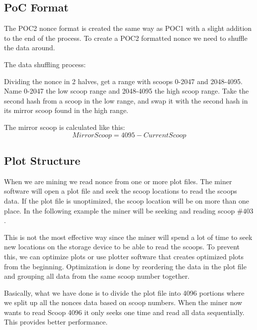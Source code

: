 \subsection{PoC Format}
\begin{flushleft}
    The POC2 nonce format is created the same way as POC1 with a slight addition to the end of the process. To create a POC2 formatted nonce we need to shuffle the data around.
\end{flushleft}
\begin{flushleft}
    The data shuffling process:
\end{flushleft}
\begin{flushleft}
    Dividing the nonce in 2 halves, get a range with scoops 0-2047 and 2048-4095. Name 0-2047 the low scoop range and 2048-4095 the high scoop range. Take the second hash from a scoop in the low range, and swap it with the second hash in its mirror scoop found in the high range.
\end{flushleft}
\begin{flushleft}
    The mirror scoop is calculated like this:
    \begin{equation}
        MirrorScoop = 4095 - CurrentScoop
    \end{equation}
\end{flushleft}

\subsection{Plot Structure}
\begin{flushleft}
    When we are mining we read nonce from one or more plot files. The miner software will open a plot file and seek the scoop locations to read the scoops data. If the plot file is unoptimized, the scoop location will be on more than one place. In the following example the miner will be seeking and reading scoop $\#403$.
\end{flushleft}

\begin{flushleft}
    This is not the most effective way since the miner will spend a lot of time to seek new locations on the storage device to be able to read the scoops. To prevent this, we can optimize plots or use plotter software that creates optimized plots from the beginning. Optimization is done by reordering the data in the plot file and grouping all data from the same scoop number together.
\end{flushleft}

\begin{flushleft}
    Basically, what we have done is to divide the plot file into 4096 portions where we split up all the nonces data based on scoop numbers. When the miner now wants to read Scoop 4096 it only seeks one time and read all data sequentially. This provides better performance.
\end{flushleft}
